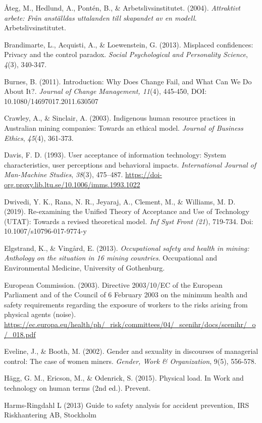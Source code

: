 \documentclass[
  12pt,
]{scrbook}
\begin{document}
Åteg, M., Hedlund, A., Pontén, B., \& Arbetslivsinstitutet. (2004).
\emph{Attraktivt arbete: Från anställdas uttalanden till skapandet av en
modell}. Arbetslivsinstitutet.

Brandimarte, L., Acquisti, A., \& Loewenstein, G. (2013). Misplaced
confidences: Privacy and the control paradox. \emph{Social Psychological and
Personality Science}, \emph{4}(3), 340-347.

Burnes, B. (2011). Introduction: Why Does Change Fail, and What Can We
Do About It?. \emph{Journal of Change Management, 11}(4), 445-450, DOI:
10.1080/14697017.2011.630507

Crawley, A., \& Sinclair, A. (2003). Indigenous human resource practices
in Australian mining companies: Towards an ethical model. \emph{Journal of
Business Ethics}, \emph{45}(4), 361-373.

Davis, F. D. (1993). User acceptance of information technology: System
characteristics, user perceptions and behavioral impacts. \emph{International
Journal of Man-Machine Studies}, \emph{38}(3), 475--487.
\url{https://doi-org.proxy.lib.ltu.se/10.1006/imms.1993.1022}

Dwivedi, Y. K., Rana, N. R., Jeyaraj, A., Clement, M., \& Williams, M. D.
(2019). Re-examining the Unified Theory of Acceptance and Use of
Technology (UTAT): Towards a revised theoretical model\emph{. Inf Syst Front
(21}), 719-734. Doi: 10.1007/s10796-017-9774-y

Elgstrand, K., \& Vingård, E. (2013). \emph{Occupational safety and health in
mining: Anthology on the situation in 16 mining countries}. Occupational
and Environmental Medicine, University of Gothenburg.

European Commission. (2003). Directive 2003/10/EC of the European
Parliament and of the Council of 6 February 2003 on the minimum health
and safety requirements regarding the exposure of workers to the risks
arising from physical agents (noise).
\url{https://ec.europa.eu/health/ph/_risk/committees/04/_scenihr/docs/scenihr/_o/_018.pdf}

Eveline, J., \& Booth, M. (2002). Gender and sexuality in discourses of
managerial control: The case of women miners. \emph{Gender, Work \&
Organization}, 9(5), 556-578.

Hägg, G. M., Ericson, M., \& Odenrick, S. (2015). Physical load. In Work
and technology on human terms (2nd ed.). Prevent.

Harms-Ringdahl L (2013) Guide to safety analysis for accident
prevention, IRS Riskhantering AB, Stockholm
\end{document}
